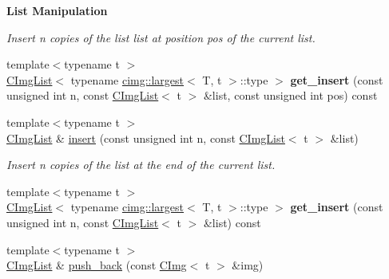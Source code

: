 \begin{Indent}{\bf List Manipulation}
\begin{DoxyCompactItemize}
\begin{DoxyCompactList}\small\item\em Insert n copies of the list {\ttfamily list} at position {\ttfamily pos} of the current list. \item\end{DoxyCompactList}\item 
\hypertarget{structcimg__library_1_1_c_img_list_ad3a64944b0e199791b6549bc9f37c571}{
{\footnotesize template$<$typename t $>$ }\\\hyperlink{structcimg__library_1_1_c_img_list}{CImgList}$<$ typename \hyperlink{structcimg__library_1_1cimg_1_1largest}{cimg::largest}$<$ T, t $>$::type $>$ {\bfseries get\_\-insert} (const unsigned int n, const \hyperlink{structcimg__library_1_1_c_img_list}{CImgList}$<$ t $>$ \&list, const unsigned int pos) const }
\label{structcimg__library_1_1_c_img_list_ad3a64944b0e199791b6549bc9f37c571}

\item 
\hypertarget{structcimg__library_1_1_c_img_list_a874bc96d779faaef23becbcaad918e0f}{
{\footnotesize template$<$typename t $>$ }\\\hyperlink{structcimg__library_1_1_c_img_list}{CImgList} \& \hyperlink{structcimg__library_1_1_c_img_list_a874bc96d779faaef23becbcaad918e0f}{insert} (const unsigned int n, const \hyperlink{structcimg__library_1_1_c_img_list}{CImgList}$<$ t $>$ \&list)}
\label{structcimg__library_1_1_c_img_list_a874bc96d779faaef23becbcaad918e0f}

\begin{DoxyCompactList}\small\item\em Insert n copies of the list at the end of the current list. \item\end{DoxyCompactList}\item 
\hypertarget{structcimg__library_1_1_c_img_list_a5477c0a44455e8ce1451cc96136446c0}{
{\footnotesize template$<$typename t $>$ }\\\hyperlink{structcimg__library_1_1_c_img_list}{CImgList}$<$ typename \hyperlink{structcimg__library_1_1cimg_1_1largest}{cimg::largest}$<$ T, t $>$::type $>$ {\bfseries get\_\-insert} (const unsigned int n, const \hyperlink{structcimg__library_1_1_c_img_list}{CImgList}$<$ t $>$ \&list) const }
\label{structcimg__library_1_1_c_img_list_a5477c0a44455e8ce1451cc96136446c0}

\item 
\hypertarget{structcimg__library_1_1_c_img_list_ae07a25653338bcc2d39f94ece79bcf43}{
{\footnotesize template$<$typename t $>$ }\\\hyperlink{structcimg__library_1_1_c_img_list}{CImgList} \& \hyperlink{structcimg__library_1_1_c_img_list_ae07a25653338bcc2d39f94ece79bcf43}{push\_\-back} (const \hyperlink{structcimg__library_1_1_c_img}{CImg}$<$ t $>$ \&img)}
\label{structcimg__library_1_1_c_img_list_ae07a25653338bcc2d39f94ece79bcf43}


\end{DoxyCompactItemize}
\end{Indent}
